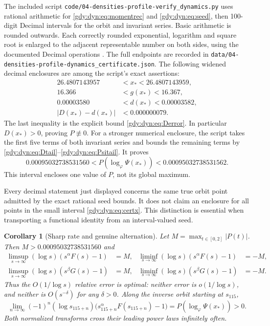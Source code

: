 \documentclass[11pt]{article}
\numberwithin{equation}{section}
\newtheorem{corollary}[theorem]{Corollary}
\theoremstyle{definition}
\theoremstyle{remark}
\begin{document}
The included script \nolinkurl{code/04-densities-profile-verify_dynamics.py} uses rational
arithmetic for \eqref{gdy:dyn:eq:momentrec} and \eqref{gdy:dyn:eq:seed}, then
100-digit Decimal intervals for the orbit and invariant series. Basic
arithmetic is rounded outwards. Each correctly rounded exponential,
logarithm and square root is enlarged to the adjacent representable
number on both sides, using the documented Decimal operations
\cite{decimal}. The full endpoints are recorded in
\nolinkurl{data/04-densities-profile-dynamics_certificate.json}. The following widened
decimal enclosures are among the script's exact assertions:
\begin{align}
 26.4807143957&<x_*<26.4807143959,\label{gdy:dyn:eq:certx}\\
 16.366&<g(x_*)<16.367,\label{gdy:dyn:eq:certg}\\
 0.00003580&<d(x_*)<0.00003582,\label{gdy:dyn:eq:certd}\\
 |D(x_*)-d(x_*)|&<0.000000079.\label{gdy:dyn:eq:certtail}
\end{align}
The last inequality is the explicit bound
\eqref{gdy:dyn:eq:Derror}. In particular $D(x_*)>0$, proving $P\not\equiv0$.
For a stronger numerical enclosure, the script takes the first five
terms of both invariant series and bounds the remaining terms by
\eqref{gdy:dyn:eq:Dtail}--\eqref{gdy:dyn:eq:Psitail}. It proves
\begin{equation}\label{gdy:dyn:eq:certP}
 0.00095032738531560
 <P(\log_\varphi\Psi(x_*))
 <0.00095032738531562.
\end{equation}
This interval encloses one value of $P$, not its global maximum.

Every decimal statement just displayed concerns the same true orbit
point admitted by the exact rational seed bounds. It does not claim an
enclosure for all points in the small interval
\eqref{gdy:dyn:eq:certx}. This distinction is essential when transporting a
functional identity from an interval-valued seed.

\begin{corollary}[Sharp rate and genuine alternation]
\label{gdy:dyn:cor:sharp}
Let $M=\max_{t\in[0,2]}|P(t)|$. Then $M>0.00095032738531560$ and
\begin{align}
 \limsup_{s\to\infty}(\log s)(s^\alpha F(s)-1)&=M,
 &\liminf_{s\to\infty}(\log s)(s^\alpha F(s)-1)&=-M,\label{gdy:dyn:eq:limsupF}\\
 \limsup_{s\to\infty}(\log s)(s^\beta G(s)-1)&=M,
 &\liminf_{s\to\infty}(\log s)(s^\beta G(s)-1)&=-M.\label{gdy:dyn:eq:limsupG}
\end{align}
Thus the $O(1/\log s)$ relative error is optimal: neither error is
$o(1/\log s)$, and neither is $O(s^{-\delta})$ for any $\delta>0$.
Along the inverse orbit starting at $s_{115}$,
\begin{equation}\label{gdy:dyn:eq:orbitlimit}
 \lim_{n\to\infty}(-1)^n(\log s_{115+n})
       \bigl(s_{115+n}^{\alpha}F(s_{115+n})-1\bigr)
 =P(\log_\varphi\Psi(x_*))>0.
\end{equation}
Both normalized transforms cross their leading power laws infinitely
often.
\end{corollary}
\end{document}
